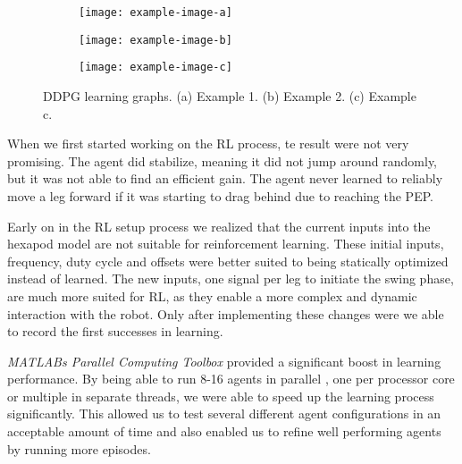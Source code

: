 \begin{figure}[h]
	\begin{subfigure}{.5\textwidth} %
		\centering
		\texttt{[image: example-image-a]}  %
		\caption{}
		\label{figure: RL a}
	\end{subfigure}
	\begin{subfigure}{.5\textwidth}
		\centering
		\texttt{[image: example-image-b]}  
		\caption{}
		\label{figure: RL b}
	\end{subfigure} 
	\begin{subfigure}{\textwidth}
		\centering
		\texttt{[image: example-image-c]}   %
		\caption{}
		\label{figure: RL c}
	\end{subfigure}
	\caption[]{DDPG learning graphs. (a) Example 1. (b) Example 2. (c) Example c.}
	\label{figure: DDPG learning graphs}
\end{figure}



When we first started working on the RL process, te result were not very promising. The agent did stabilize, meaning it did not jump around randomly, but it was not able to find an efficient gain.
The agent never learned to reliably move a leg forward if it was starting to drag behind due to reaching the PEP.

Early on in the RL setup process we realized that the current inputs into the hexapod model are not suitable for reinforcement learning.
These initial inputs, frequency, duty cycle and offsets were better suited to being statically optimized instead of learned.
The new inputs, one signal per leg to initiate the swing phase, are much more suited for RL, as they enable a more complex and dynamic interaction with the robot.
Only after implementing these changes were we able to record the first successes in learning.


\textit{MATLABs Parallel Computing Toolbox} provided a significant boost in learning performance.
By being able to run 8-16 agents in parallel , one per processor core or multiple in separate threads, we were able to speed up the learning process significantly.
This allowed us to test several different agent configurations in an acceptable amount of time and also enabled us to refine well performing agents by running more episodes.

